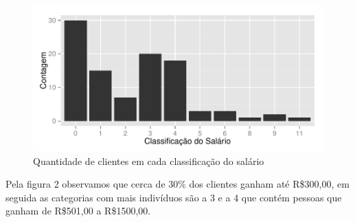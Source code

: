 \documentclass{article}\usepackage[]{graphicx}\usepackage[]{color}
\makeatletter
\def\maxwidth{ %
  \ifdim\Gin@nat@width>\linewidth
    \linewidth
  \else
    \Gin@nat@width
  \fi
}
\newenvironment{knitrout}{}{} %
\makeatother
\begin{document}
\begin{figure}[t!]

\centering
\begin{knitrout}
\color{fgcolor}
\includegraphics[width=\maxwidth]{figure/unnamed-chunk-3} 

\end{knitrout}
\caption{Quantidade de clientes em cada classificação do salário}
\end{figure}

Pela figura 2 observamos que cerca de 30\% dos clientes ganham até R\$300,00, em seguida as categorias com mais indivíduos são a 3 e a 4 que contém pessoas que ganham de R\$501,00 a R\$1500,00.
\end{document}
